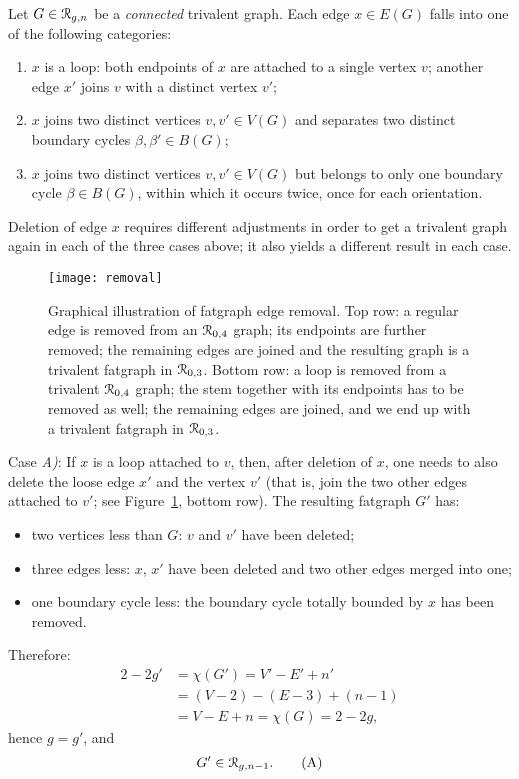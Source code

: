 Let $G \in \mathcal{R}_{g,n}$ be a \emph{connected} trivalent graph. Each edge
$x \in E(G)$ falls into one of the following categories:
\begin{enumerate}[\slshape A)]
\item $x$ is a loop: both endpoints of $x$ are
  attached to a single vertex $v$; another edge $x'$ joins $v$ with a
  distinct vertex $v'$;
\item $x$ joins two distinct vertices $v, v'
  \in V(G)$ and separates two distinct boundary cycles $\beta, \beta'
  \in B(G)$;
\item $x$ joins two distinct vertices $v, v'
  \in V(G)$ but belongs to only one boundary cycle $\beta \in B(G)$,
  within which it occurs twice, once for each orientation.
\end{enumerate}
Deletion of edge $x$ requires different adjustments in order to get a
trivalent graph again in each of the three cases above; it also yields
a different result in each case.
\begin{figure}
  \centering
  \texttt{[image: removal]}
  \caption{Graphical illustration of fatgraph edge removal.  Top row: a regular edge is removed from an $\mathcal{R}_{0,4}$ graph; its endpoints are further removed; the remaining edges are joined and the resulting graph is a trivalent fatgraph in $\mathcal{R}_{0,3}$.  Bottom row: a loop is removed from a trivalent $\mathcal{R}_{0,4}$ graph; the stem together with its endpoints has to be removed as well; the remaining edges are joined, and we end up with a trivalent fatgraph in $\mathcal{R}_{0,3}$.}
  \label{fig:removal}
\end{figure}

Case {\slshape A)}: If $x$ is a loop attached to $v$, then, after deletion
of $x$, one needs to also delete the loose edge $x'$ and the
vertex $v'$ (that is, join the two other edges attached to $v'$; see
Figure~\ref{fig:removal}, bottom row).  The resulting fatgraph $G'$ has:
\begin{itemize}
\item two vertices less than $G$: $v$ and $v'$ have been deleted;
\item three edges less: $x$, $x'$ have been deleted and two other
  edges merged into one;
\item one boundary cycle less: the boundary cycle totally bounded by
  $x$ has been removed.
\end{itemize}
Therefore:
\begin{align*}
  2 - 2g' &= \chi(G') = V' - E' + n' 
  \\
  &= (V-2) -(E-3) + (n-1)
  \\
  &= V - E + n = \chi(G) = 2 - 2g,
\end{align*}
hence $g=g'$, and 
\begin{equation}
G' \in \mathcal{R}_{g,n-1}.
\label{eq:A}\tag{A}
\end{equation}

